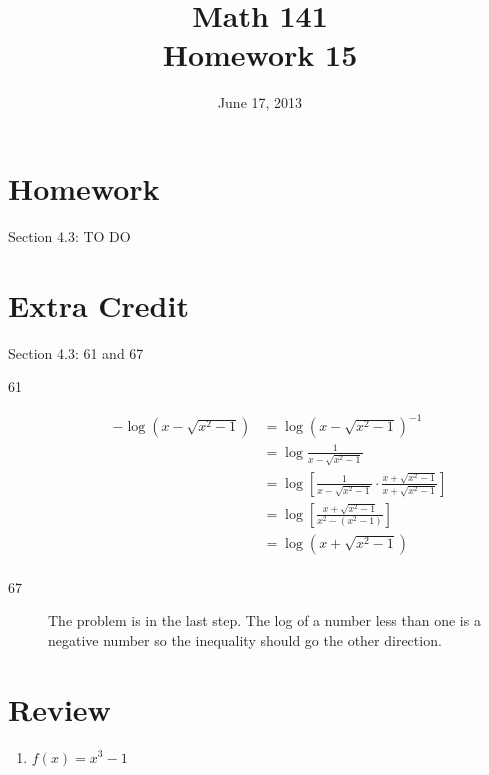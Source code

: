 \documentclass{exam}
\date{June 17, 2013}
\author{}
\title{Math 141 \\ Homework 15}
\begin{document}
  \maketitle

  \section{Homework}

  Section 4.3: TO DO

 \section{Extra Credit}
  Section 4.3: 61 and 67

  \ifprintanswers
    \begin{description}
      \item[61]
        \begin{align*}
          - \log(x - \sqrt{x^2 - 1}) &= \log(x - \sqrt{x^2 - 1})^{-1} \\
                                     &= \log \frac{1}{x - \sqrt{x^2 - 1}} \\
                                     &= \log \left[ \frac{1}{x - \sqrt{x^2 - 1}} \cdot \frac{x + \sqrt{x^2 - 1}}{x + \sqrt{x^2 - 1}} \right] \\
                                     &= \log \left[ \frac{x + \sqrt{x^2 - 1}}{x^2 - (x^2 - 1)} \right] \\
                                     &= \log ( x + \sqrt{x^2 - 1} ) \\
        \end{align*}

      \item[67]
        The problem is in the last step.  The log of a number less than one is a negative number so the inequality should go the other direction.

    \end{description}
  \fi

  \section{Review}

  \begin{enumerate}

    \item $f(x) = x^3 - 1$ 

  \end{enumerate}
\end{document}

